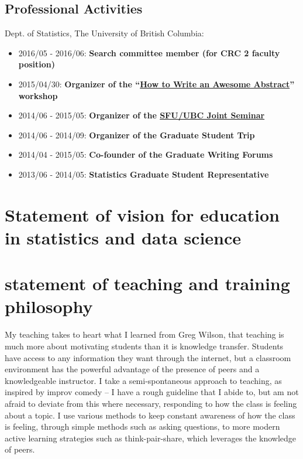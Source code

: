 \documentclass[]{book}
\providecommand{\tightlist}{%
  \setlength{\itemsep}{0pt}\setlength{\parskip}{0pt}}
\begin{document}
\hypertarget{professional-activities}{%
\section{Professional Activities}\label{professional-activities}}

Dept. of Statistics, The University of British Columbia:

\begin{itemize}
\tightlist
\item
  2016/05 - 2016/06: \textbf{Search committee member (for CRC 2 faculty position)}
\item
  2015/04/30: \textbf{Organizer of the ``\href{http://stat.ubc.ca/~vincen.coia/abstractworkshop.html}{How to Write an Awesome Abstract}'' workshop}
\item
  2014/06 - 2015/05: \textbf{Organizer of the \href{http://stat.ubc.ca/~vincen.coia/seminar.html}{SFU/UBC Joint Seminar}}
\item
  2014/06 - 2014/09: \textbf{Organizer of the Graduate Student Trip}
\item
  2014/04 - 2015/05: \textbf{Co-founder of the Graduate Writing Forums}
\item
  2013/06 - 2014/05: \textbf{Statistics Graduate Student Representative}
\end{itemize}

\hypertarget{statement-of-vision-for-education-in-statistics-and-data-science}{%
\chapter{Statement of vision for education in statistics and data science}\label{statement-of-vision-for-education-in-statistics-and-data-science}}

\hypertarget{statement-of-teaching-and-training-philosophy}{%
\chapter{statement of teaching and training philosophy}\label{statement-of-teaching-and-training-philosophy}}

My teaching takes to heart what I learned from Greg Wilson, that teaching is much more about motivating students than it is knowledge transfer. Students have access to any information they want through the internet, but a classroom environment has the powerful advantage of the presence of peers and a knowledgeable instructor. I take a semi-spontaneous approach to teaching, as inspired by improv comedy -- I have a rough guideline that I abide to, but am not afraid to deviate from this where necessary, responding to how the class is feeling about a topic. I use various methods to keep constant awareness of how the class is feeling, through simple methods such as asking questions, to more modern active learning strategies such as think-pair-share, which leverages the knowledge of peers.
\end{document}
